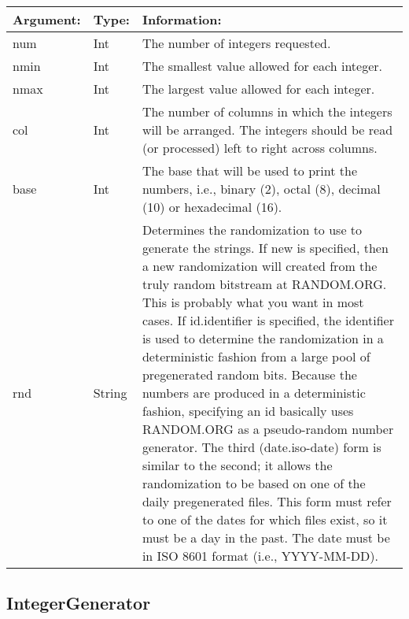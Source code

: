 \documentclass[12 pt]{report}
\begin{document}
\begin{tabular}{ | l | l | p{10cm} | }
    \hline
    \textbf{Argument:} & \textbf{Type:} & \textbf{Information:} \\ \hline
    num & Int &The number of integers requested. \\ \hline
    nmin & Int &The smallest value allowed for each integer. \\ \hline
    nmax & Int &The largest value allowed for each integer.\\ \hline
    col & Int &The number of columns in which the integers will be arranged. The integers should be read (or processed) left to right across columns. \\ \hline
    base & Int & The base that will be used to print the numbers, i.e., binary (2), octal (8), decimal (10) or hexadecimal (16). \\ \hline
    rnd & String & Determines the randomization to use to generate the strings. If new is specified, then a new randomization will created from the truly random bitstream at RANDOM.ORG. This is probably what you want in most cases. If id.identifier is specified, the identifier is used to determine the randomization in a deterministic fashion from a large pool of pregenerated random bits. Because the numbers are produced in a deterministic fashion, specifying an id basically uses RANDOM.ORG as a pseudo-random number generator. The third (date.iso-date) form is similar to the second; it allows the randomization to be based on one of the daily pregenerated files. This form must refer to one of the dates for which files exist, so it must be a day in the past. The date must be in ISO 8601  format (i.e., YYYY-MM-DD). \\
    \hline
  \end{tabular}
  

\subsection{IntegerGenerator}
\end{document}
